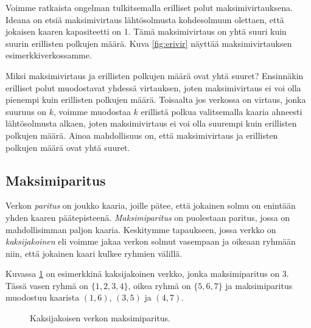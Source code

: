 Voimme ratkaista ongelman
tulkitsemalla erilliset polut maksimivirtauksena.
Ideana on etsiä maksimivirtaus lähtösolmusta kohdesolmuun
olettaen, että jokaisen kaaren kapasiteetti on $1$.
Tämä maksimivirtaus on yhtä suuri kuin suurin
erillisten polkujen määrä.
Kuva \ref{fig:erivir} näyttää maksimivirtauksen
esimerkkiverkossamme.

Miksi maksimivirtaus ja erillisten polkujen määrä ovat yhtä suuret?
Ensinnäkin erilliset polut muodostavat yhdessä virtauksen,
joten maksimivirtaus ei voi olla pienempi kuin erillisten polkujen määrä.
Toisaalta jos verkossa on virtaus, jonka suuruus on $k$,
voimme muodostaa $k$ erillistä polkua
valitsemalla kaaria ahneesti lähtösolmusta alkaen,
joten maksimivirtaus ei voi olla suurempi kuin erillisten polkujen määrä.
Ainoa mahdollisuus on, että maksimivirtaus ja erillisten polkujen määrä
ovat yhtä suuret.

\subsection{Maksimiparitus}


Verkon \emph{paritus} on joukko kaaria, joille pätee,
että jokainen solmu on enintään yhden kaaren päätepisteenä.
\emph{Maksimiparitus} on puolestaan paritus,
jossa on mahdollisimman paljon kaaria.
Keskitymme tapaukseen,
jossa verkko on \emph{kaksijakoinen} eli
voimme jakaa verkon solmut
vasempaan ja oikeaan ryhmään niin, että jokainen
kaari kulkee ryhmien välillä.

Kuvassa \ref{fig:makpar} on esimerkkinä kaksijakoinen verkko,
jonka maksimiparitus on $3$.
Tässä vasen ryhmä on $\{1,2,3,4\}$, oikea ryhmä on $\{5,6,7\}$
ja maksimiparitus muodostuu kaarista
$(1,6)$, $(3,5)$ ja $(4,7)$.

\begin{figure}
\center
\begin{center}
\end{center}
\caption{Kaksijakoisen verkon maksimiparitus.}
\label{fig:makpar}
\end{figure}

